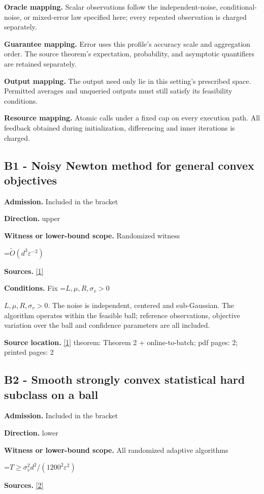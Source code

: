\documentclass[10pt,a4paper]{article}
\newcommand{\AtlasMath}[1]{\par\begingroup\centering\setbox0=\hbox{$\displaystyle #1$}\ifdim\wd0>1.4\linewidth\typeout{ATLAS WIDE FORMULA: \the\wd0}\fi\ifdim\wd0>\linewidth\resizebox{\linewidth}{!}{\box0}\else\box0\fi\par\endgroup}
\newcommand{\AtlasInlineMath}[1]{\begingroup\setbox0=\hbox{$#1$}\ifdim\wd0>.4\linewidth\endgroup\AtlasMath{#1}\else\endgroup$#1$\fi}
\begin{document}
\textbf{Oracle mapping.} Scalar observations follow the independent-noise, conditional-noise, or mixed-error law specified here; every repeated observation is charged separately.

\textbf{Guarantee mapping.} Error uses this profile's accuracy scale and aggregation order. The source theorem's expectation, probability, and asymptotic quantifiers are retained separately.

\textbf{Output mapping.} The output need only lie in this setting's prescribed space. Permitted averages and unqueried outputs must still satisfy its feasibility conditions.

\textbf{Resource mapping.} Atomic calls under a fixed cap on every execution path. All feedback obtained during initialization, differencing and inner iterations is charged.

\subsection{B1 - Noisy Newton method for general convex objectives}
\textbf{Admission.} Included in the bracket

\textbf{Direction.} upper

\textbf{Witness or lower-bound scope.} Randomized witness

\AtlasMath{\widetilde{O}(d^3\varepsilon^{-2})}
\textbf{Sources.} \href{https://arxiv.org/pdf/2406.06506}{[1]}

\textbf{Conditions.} Fix \AtlasInlineMath{L,\mu,R,\sigma_v>0}. The noise is independent, centered and sub-Gaussian. The algorithm operates within the feasible ball; reference observations, objective variation over the ball and confidence parameters are all included.

\textbf{Source location.} \href{https://arxiv.org/pdf/2406.06506}{[1]} theorem: Theorem 2 + online-to-batch; pdf pages: 2; printed pages: 2

\subsection{B2 - Smooth strongly convex statistical hard subclass on a ball}
\textbf{Admission.} Included in the bracket

\textbf{Direction.} lower

\textbf{Witness or lower-bound scope.} All randomized adaptive algorithms

\AtlasMath{T\ge\sigma_v^2d^2/(1200^2\varepsilon^2)}
\textbf{Sources.} \href{https://proceedings.mlr.press/v30/Shamir13.html}{[2]}
\end{document}
